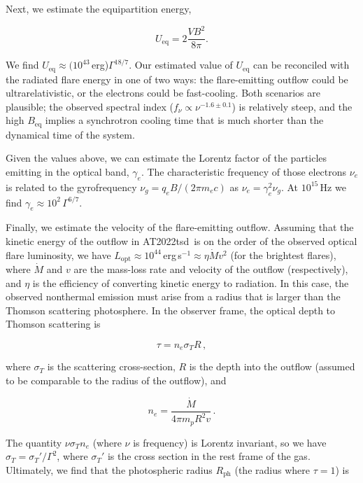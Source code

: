 \documentclass{nature_plusfigure}
\newcommand{\at}{AT2022tsd}
\begin{document}
\begin{methods}
Next, we estimate the equipartition energy,

\begin{equation}
    U_\mathrm{eq} = 2 \frac{VB^2}{8\pi}.
\end{equation}

We find  $U_\mathrm{eq}\approx(10^{43}\,$erg)$\Gamma^{18/7}$. Our estimated value of $U_\mathrm{eq}$ can be reconciled with the radiated flare energy in one of two ways: the flare-emitting outflow could be ultrarelativistic, or the electrons could be fast-cooling. Both scenarios are plausible; the observed spectral index ($f_\nu\propto\nu^{-1.6\pm0.1}$) is relatively steep, and the high $B_\mathrm{eq}$ implies a synchrotron cooling time that is much shorter than the dynamical time of the system. %

Given the values above, we can estimate the Lorentz factor of the particles emitting in the optical band, $\gamma_e$. The characteristic frequency of those electrons $\nu_e$ is related to the gyrofrequency $\nu_g=q_e B/(2\pi m_e c)$ as $\nu_e = \gamma_e^2 \nu_g$.
At $10^{15}$\,Hz we find $\gamma_e\approx10^{2}\, \Gamma^{6/7}$.

Finally, we estimate the velocity of the flare-emitting outflow. Assuming that the kinetic energy of the outflow in \at\ is on the order of the observed optical flare luminosity, we have $L_\mathrm{opt} \approx 10^{44}\,$erg\,s$^{-1} \approx \eta \dot{M}v^2$ (for the brightest flares), where $\dot{M}$ and $v$ are the mass-loss rate and velocity of the outflow (respectively), and $\eta$ is the efficiency of converting kinetic energy to radiation. In this case, the observed nonthermal emission must arise from a radius that is larger than the Thomson scattering photosphere. In the observer frame, the optical depth to Thomson scattering is

\begin{equation}
\tau = n_e \sigma_T R\, ,
\end{equation}

\noindent where $\sigma_T$ is the scattering cross-section, $R$ is the depth into the outflow (assumed to be comparable to the radius of the outflow), and

\begin{equation}
    n_e = \frac{\dot{M}}{4\pi m_p R^2 v}\, .
\end{equation}

\noindent The quantity $\nu \sigma_T n_e$ (where $\nu$ is frequency) is Lorentz invariant\cite{Rybicki1986}, so we have $\sigma_T = \sigma_T' / \Gamma^2$, where $\sigma_T'$ is the cross section in the rest frame of the gas. Ultimately, we find that the photospheric radius $R_\mathrm{ph}$ (the radius where $\tau=1$) is


\end{methods}
\end{document}
